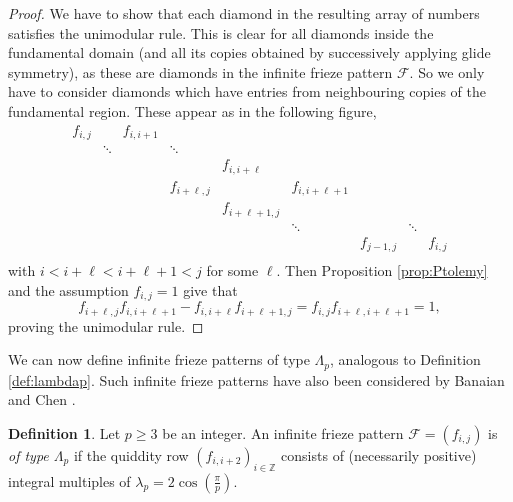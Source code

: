\documentclass[11pt,a4paper]{amsart}
\theoremstyle{definition}
\newtheorem{Definition}[Lemma]{Definition}
\numberwithin{equation}{section}
\begin{document}
\begin{proof}
We have to show that each diamond in the resulting array of numbers satisfies the unimodular rule. 
This is clear for all diamonds inside the fundamental domain (and all its copies obtained by successively
applying glide symmetry), as these are diamonds in the infinite frieze pattern $\mathcal{F}$. So we only have 
to consider diamonds which have entries from neighbouring copies of the fundamental region. These appear 
as in the following figure,
$$\begin{array}{ccccccccc} 
f_{i,j} & & f_{i,i+1} & & & & & & \\
& \ddots & & \ddots & & & & & \\
& & &  & f_{i,i+\ell} & & & & \\
& &  & f_{i+\ell,j} & & f_{i,i+\ell+1} & & & \\
& &  & & f_{i+\ell+1,j} & & & & \\
& & & &  &\ddots & & \ddots & \\
& & & &  & & f_{j-1,j} & & f_{i,j} \\
\end{array}
$$ 
with $i<i+\ell<i+\ell+1<j$ for some $\ell$. Then Proposition \ref{prop:Ptolemy} and the assumption
$f_{i,j}=1$ give that 
$$f_{i+\ell,j} f_{i,i+\ell+1} - f_{i,i+\ell} f_{i+\ell+1,j} = f_{i,j} f_{i+\ell,i+\ell+1} =1,
$$
proving the unimodular rule. 
\end{proof}


\medskip

We can now define infinite frieze patterns of type $\Lambda_p$, analogous to Definition 
\ref{def:lambdap}. Such infinite frieze patterns have also been considered by Banaian and Chen
\cite{BC21}. 

\begin{Definition} \label{def:infinitelambdap}
Let $p\ge 3$ be an integer. An infinite frieze pattern $\mathcal{F}=(f_{i,j})$ is {\em of type $\Lambda_p$} if the 
quiddity row $(f_{i,i+2})_{i\in \mathbb{Z}}$
consists of (necessarily positive) integral multiples of $\lambda_p=2\cos(\frac{\pi}{p})$. 
\end{Definition}
\end{document}
